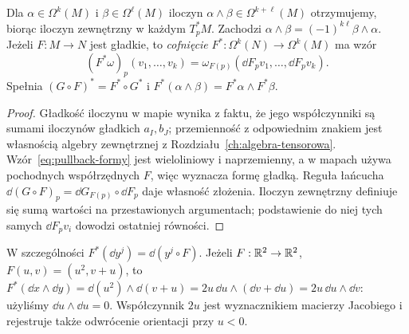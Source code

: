 \begin{stwierdzenie}
\label{prop:formy-wedge-pullback}
Dla $\alpha\in\Omega^k(M)$ i $\beta\in\Omega^\ell(M)$
iloczyn $\alpha\wedge\beta\in\Omega^{k+\ell}(M)$
otrzymujemy, biorąc iloczyn zewnętrzny w każdym
$T_p^*M$. Zachodzi $\alpha\wedge\beta
=(-1)^{k\ell}\beta\wedge\alpha$.
Jeżeli $F:M\to N$ jest gładkie, to \emph{cofnięcie}
$F^*:\Omega^k(N)\to\Omega^k(M)$ ma wzór
\begin{equation}\label{eq:pullback-formy}
 (F^*\omega)_p(v_1,\ldots,v_k)
 =\omega_{F(p)}(\dd F_pv_1,\ldots,\dd F_pv_k).
\end{equation}
Spełnia $(G\circ F)^*=F^*\circ G^*$ i
$F^*(\alpha\wedge\beta)=F^*\alpha\wedge F^*\beta$.
\end{stwierdzenie}
\begin{proof}
Gładkość iloczynu w mapie wynika z faktu, że jego
współczynniki są sumami iloczynów gładkich $a_I,b_J$;
przemienność z odpowiednim znakiem jest własnością
algebry zewnętrznej z Rozdziału~\ref{ch:algebra-tensorowa}.
Wzór~\eqref{eq:pullback-formy} jest wieloliniowy i
naprzemienny, a w mapach używa pochodnych współrzędnych
$F$, więc wyznacza formę gładką. Reguła łańcucha
$\dd(G\circ F)_p=\dd G_{F(p)}\circ\dd F_p$
daje własność złożenia. Iloczyn zewnętrzny definiuje
się sumą wartości na przestawionych argumentach; podstawienie
do niej tych samych $\dd F_pv_i$ dowodzi ostatniej równości.
\end{proof}

W szczególności $F^*(\dd y^j)=\dd(y^j\circ F)$.
Jeżeli $F:\mathbb{R}^2\to\mathbb{R}^2$, $F(u,v)=(u^2,v+u)$,
to $F^*(\dd x\wedge\dd y)
=\dd(u^2)\wedge\dd(v+u)
=2u\,\dd u\wedge(\dd v+\dd u)=2u\,\dd u\wedge\dd v$:
użyliśmy $\dd u\wedge\dd u=0$.
Współczynnik $2u$ jest wyznacznikiem macierzy Jacobiego
i rejestruje także odwrócenie orientacji przy $u<0$.

